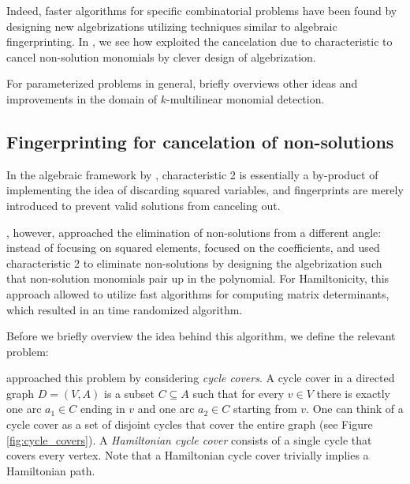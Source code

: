 Indeed, faster algorithms for specific combinatorial problems 
have been found by designing new algebrizations utilizing techniques 
similar to algebraic fingerprinting. In , 
we see how \textcite{Björklund14} 
exploited the cancelation due to characteristic to cancel non-solution monomials 
by clever design of algebrization. 

For parameterized problems in general, 
briefly overviews other ideas and 
improvements in the domain of $k$-multilinear monomial detection.

\subsection{Fingerprinting for cancelation of non-solutions}
\label{sect:cancel_nonsolutions}

In the algebraic framework by \citeauthor{KouWil09}, 
characteristic 2 is essentially a by-product of implementing 
the idea of discarding squared variables, and fingerprints are merely 
introduced to prevent valid solutions from canceling out.

\textcite{Björklund14}, however, approached the elimination of 
non-solutions from a different angle: instead of focusing on squared elements, 
\citeauthor{Björklund14} focused on the coefficients, 
and used characteristic 2 to eliminate non-solutions by designing 
the algebrization such that non-solution monomials pair up in the polynomial. 
For Hamiltonicity, this approach allowed \citeauthor{Björklund14} to utilize 
fast algorithms for computing matrix determinants, which resulted in an 
 time randomized algorithm.

Before we briefly overview the idea behind this algorithm, we define the 
relevant problem:
\begin{problem}
\end{problem}

\citeauthor{Björklund14} approached this problem by considering \emph{cycle covers}. 
A cycle cover in a directed graph $D = (V, A)$ is a 
subset $C \subseteq A$ such that for every $v \in V$ there is exactly one arc $a_1 \in C$ ending in $v$ 
and one arc $a_2 \in C$ starting from $v$. One can think of a cycle cover as a set of disjoint 
cycles that cover the entire graph (see Figure \ref{fig:cycle_covers}). 
A \emph{Hamiltonian cycle cover} consists of a single cycle that covers every vertex. 
Note that a Hamiltonian cycle cover trivially implies a Hamiltonian path.


